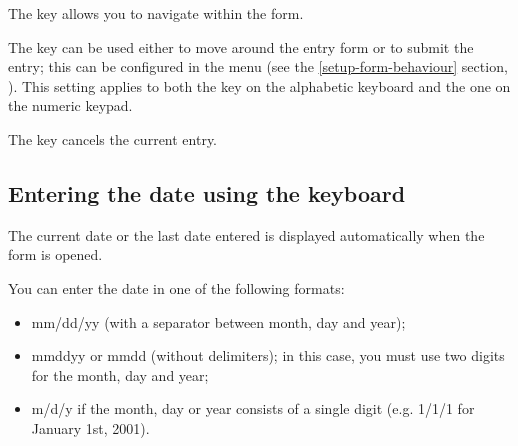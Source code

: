 The  key allows you to navigate within the form.

The  key can be used either to move around the entry form or to submit the entry; this can be configured in the  menu (see the \vref{setup-form-behaviour} section, ). This setting applies to both the  key on the alphabetic keyboard and the one on the numeric keypad.

The  key cancels the current entry.


\subsection{Entering the date using the keyboard\label{transactions-new-dates}}

The current date or the last date entered is displayed automatically when the form is opened.

You can enter the date in one of the following formats:

\begin{itemize}
	\item mm/dd/yy (with a separator between month, day and year);
	\item mmddyy or mmdd (without delimiters); in this case, you must use two digits for the month, day and year;
	\item m/d/y if the month, day or year consists of a single digit (e.g. 1/1/1 for January 1st, 2001).
\end{itemize}

